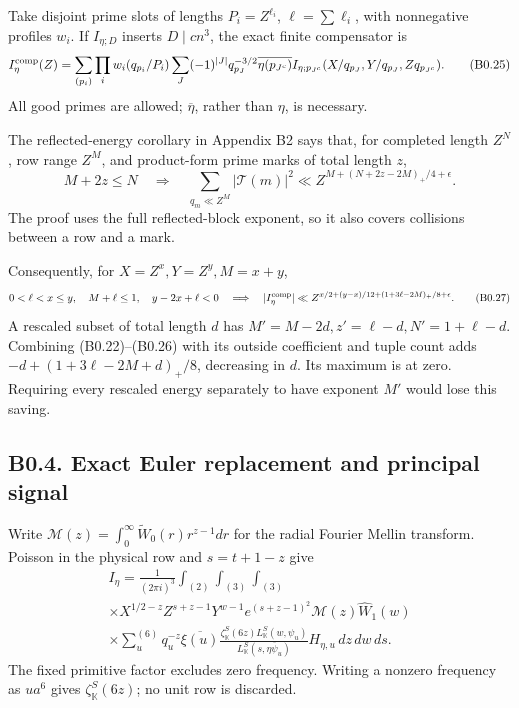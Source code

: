 \documentclass[11pt,a4paper]{article}
\begin{document}
Take disjoint prime slots of lengths \(P_i=Z^{\ell_i}\),
\(\ell=\sum\ell_i\), with nonnegative profiles \(w_i\). If
\(I_{\eta;D}\) inserts \(D\mid cn^3\), the exact finite compensator is
\[
I_\eta^{\rm comp}(Z)=\sum_{(p_i)}\prod_iw_i(q_{p_i}/P_i)
\sum_J(-1)^{|J|}q_{p_J}^{-3/2}\overline{\eta(p_{J^c})}
I_{\eta;p_{J^c}}(X/q_{p_J},Y/q_{p_J},Zq_{p_{J^c}}).
\tag{B0.25}
\] All good primes are allowed; \(\overline\eta\), rather than \(\eta\),
is necessary.

The reflected-energy corollary in Appendix B2 says that, for completed
length \(Z^N\), row range \(Z^M\), and product-form prime marks of total
length \(z\), \[
M+2z\le N\quad\Longrightarrow\quad
\sum_{q_m\ll Z^M}|\mathcal T(m)|^2\ll Z^{M+(N+2z-2M)_+/4+\epsilon}.
\tag{B0.26}
\] The proof uses the full reflected-block exponent, so it also covers
collisions between a row and a mark.

Consequently, for \(X=Z^x,\allowbreak{}Y=Z^y,\allowbreak{}M=x+y\), \[
0<\ell<x\le y,\quad M+\ell\le1,\quad y-2x+\ell<0
\quad\Longrightarrow\quad
|I_\eta^{\rm comp}|\ll Z^{x/2+(y-x)/12+(1+3\ell-2M)_+/8+\epsilon}.
\tag{B0.27}
\] A rescaled subset of total length \(d\) has
\(M'=M-2d,\allowbreak{}z'=\ell-d,\allowbreak{}N'=1+\ell-d\). Combining (B0.22)--(B0.26) with its
outside coefficient and tuple count adds \(-d+(1+3\ell-2M+d)_+/8\),
decreasing in \(d\). Its maximum is at zero. Requiring every rescaled
energy separately to have exponent \(M'\) would lose this saving.

\hypertarget{b0.4.-exact-euler-replacement-and-principal-signal}{%
\subsection{B0.4. Exact Euler replacement and principal
signal}\label{b0.4.-exact-euler-replacement-and-principal-signal}}

Write \(\mathscr M(z)=\int_0^\infty\widetilde W_0(r)r^{z-1}dr\) for the
radial Fourier Mellin transform. Poisson in the physical row and
\(s=t+1-z\) give \[
\begin{gathered}
I_\eta=\frac1{(2\pi i)^3}\int_{(2)}\int_{(3)}\int_{(3)}\\
\times X^{1/2-z}Z^{s+z-1}Y^{w-1}e^{(s+z-1)^2}\mathscr M(z)\widehat W_1(w)\\
\times\sum_u^{(6)}q_u^{-z}\overline{\xi(u)}
\frac{\zeta_{\mathbb K}^S(6z)L_{\mathbb K}^S(w,\psi_u)}{L_{\mathbb K}^S(s,\eta\overline\psi_u)}H_{\eta,u}\,dz\,dw\,ds.
\end{gathered}
\tag{B0.28}
\] The fixed primitive factor excludes zero frequency. Writing a nonzero
frequency as \(ua^6\) gives \(\zeta_{\mathbb K}^S(6z)\); no unit row is
discarded.
\end{document}

